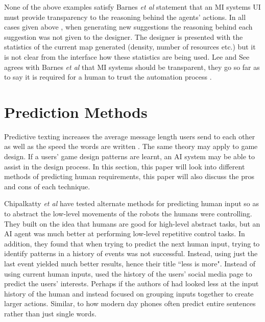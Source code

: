 \documentclass[journal]{IEEEtran}
\begin{document}
None of the above examples \cite{alvarez2018fostering, liapis2013sentient, baldwin2017mixed} satisfy Barnes \textit{et al}\cite{barnes2015designing} statement that an MI systems UI must provide transparency to the reasoning behind the agents' actions. In all cases given above\cite{alvarez2018fostering, liapis2013sentient, baldwin2017mixed} , when generating new suggestions the reasoning behind each suggestion was not given to the designer. The designer is presented with the statistics of the current map generated (density, number of resources etc.) but it is not clear from the interface how these statistics are being used. Lee and See\cite{lee2004trust} agrees with Barnes \textit{et al}\cite{barnes2015designing} that MI systems should be transparent, they go so far as to say it is required for a human to trust the automation process \cite{lee2004trust}.

\section{Prediction Methods} \label{prediction}
Predictive texting increases the average message length users send to each other \cite{ling2005length} as well as the speed the words are written \cite{dunlop2000predictive}. The same theory may apply to game design. If a users' game design patterns are learnt, an AI system may be able to assist in the design process. In this section, this paper will look into different methods of predicting human requirements, this paper will also discuss the pros and cons of each technique.

Chipalkatty \textit{et al}\cite{chipalkatty2013less} have tested alternate methods for predicting human input so as to abstract the low-level movements of the robots the humans were controlling. They built on the idea that humans are good for high-level abstract tasks, but an AI agent was much better at performing low-level repetitive control tasks. In addition, they found that when trying to predict the next human input, trying to identify patterns in a history of events was not successful. Instead, using just the last event yielded much better results, hence their title ``less is more". Instead of using current human inputs, \cite{bhatia2016targeted} used the history of the users' social media page to predict the users' interests. Perhaps if the authors of \cite{chipalkatty2013less} had looked less at the input history of the human and instead focused on grouping inputs together to create larger actions. Similar, to how modern day phones often predict entire sentences rather than just single words.
\end{document}
